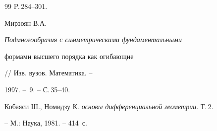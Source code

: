 \begin{thebibliography}{99}
P.\,284--301. 




Мирзоян В.А. {\em Подмногообразия с симметрическими фундаментальными 


формами высшего порядка как огибающие} // Изв. вузов. Математика. -- 


1997. -- \No\,9. -- С.\,35--40. 




Кобаяси Ш., Номидзу К. {\em основы дифференциальной геометрии}. Т.\,2. 


-- М.: Наука, 1981. -- 414~с. 


 


 


\end{thebibliography} 


 


\vskip 2cm 


 






 


\label{end} 


 


